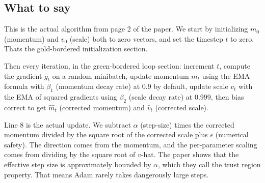 \documentclass[11pt, letterpaper]{article}
\begin{document}
\subsection{What to say}

This is the actual algorithm from page 2 of the paper. We start by initializing $m_0$ (momentum) and $v_0$ (scale) both to zero vectors, and set the timestep $t$ to zero. Thats the gold-bordered initialization section.

Then every iteration, in the green-bordered loop section: increment $t$, compute the gradient $g_t$ on a random minibatch, update momentum $m_t$ using the EMA formula with $\beta_1$ (momentum decay rate) at 0.9 by default, update scale $v_t$ with the EMA of squared gradients using $\beta_2$ (scale decay rate) at 0.999, then bias correct to get $\hat{m}_t$ (corrected momentum) and $\hat{v}_t$ (corrected scale).

Line 8 is the actual update. We subtract $\alpha$ (step-size) times the corrected momentum divided by the square root of the corrected scale plus $\epsilon$ (numerical safety). The direction comes from the momentum, and the per-parameter scaling comes from dividing by the square root of $v$-hat. The paper shows that the effective step size is approximately bounded by $\alpha$, which they call the trust region property. That means Adam rarely takes dangerously large steps.
\end{document}

